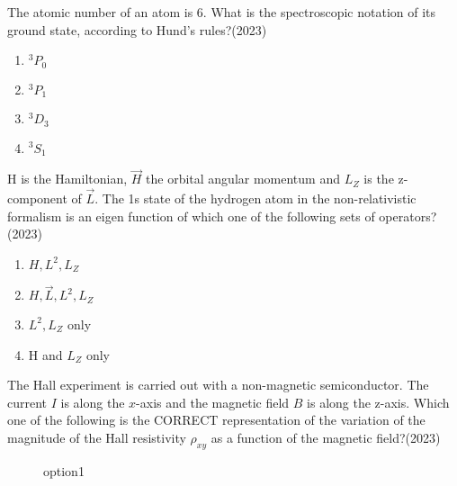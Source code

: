 
\iffalse
\chapter{2023}
\author{AI24BTECH11008}
\section{ph}
\fi

    \item The atomic number of an atom is 6. What is the spectroscopic notation of its
	    ground state, according to Hund's rules?\hfill (2023)
    \begin{enumerate}[label = (\Alph*)]
        \item $^3P_0$
        \item $^3P_1$
        \item $^3D_3$
        \item $^3S_1$
    \end{enumerate}
    \item H is the Hamiltonian, $\overrightarrow{H}$ the orbital angular momentum and $L_Z$
    is the z-component of $\overrightarrow{L}$. The 1s state of the hydrogen atom in the non-relativistic
    formalism is an eigen function of which one of the following sets of operators?\hfill (2023)
    \begin{enumerate}[label = (\Alph*)]
        \item $H, L^2, L_Z$
        \item $H,\overrightarrow{L}, L^2, L_Z$
        \item $ L^2, L_Z$ only 
        \item H and $L_Z$ only 
     \end{enumerate} 
    \item The Hall experiment is carried out with a non-magnetic semiconductor. The
    current $I$ is along the $x$-axis and the magnetic field $B$ is along the z-axis. Which
    one of the following is the CORRECT representation of the variation of the
    magnitude of the Hall resistivity $\rho_{xy}$ as a function of the magnetic field?\hfill (2023)
    \begin{figure}[!ht]
        \centering
        \caption{option1}
    \end{figure}
